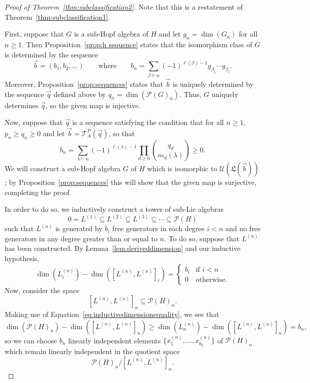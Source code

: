 \documentclass[11pt]{amsart}
\theoremstyle{definition}
\numberwithin{equation}{section}
\begin{document}
\begin{proof}[Proof of Theorem~\ref{thm:subclassification2}]
Note that this is a restatement of Theorem~\ref{thm:subclassification1}.  

First, suppose that $G$ is a sub-Hopf algebra of $H$ and let $g_{n} = \dim(G_{n})$ for all $n \ge 1$.  Then Proposition~\ref{prop:h sequence} states that the isomorphism class of $G$ is determined by the sequence
\[
\vec{b} = (b_{1}, b_{2}, \ldots) 
\qquad\text{where}\qquad
b_{n} = \sum_{\beta \vDash n} (-1)^{\ell(\beta) - 1} g_{\beta_{1}} \cdots g_{\beta_{\ell}}.
\]
Moreover, Proposition~\ref{prop:sequences} states that $\vec{b}$ is uniquely determined by the sequence $\vec{q}$ defined above by $q_{n} = \dim(\mathcal{P}(G)_{n})$.  Thus, $G$ uniquely determines $\vec{q}$, so the given map is injective.

Now, suppose that $\vec{q}$ is a sequence satisfying the condition that for all $n \ge 1$, $p_{n} \ge q_{n} \ge 0$ and let $\vec{b} = \mathcal{T}^{P}_{A}(\vec{q})$, so that
\[
b_{n} = \sum_{\lambda \vdash n} (-1)^{\ell(\lambda) - 1} \prod_{d \ge 0} \binom{q_{d}}{m_{d}(\lambda)} \ge 0.
\]
We will construct a sub-Hopf algebra $G$ of $H$ which is isomorphic to $\mathcal{U}(\mathfrak{L}(\vec{b}))$; by Proposition~\ref{prop:sequences} this will show that the given map is surjective, completing the proof.  

In order to do so, we inductively construct a tower of sub-Lie algebras 
\[
0 = L^{(1)} \subseteq L^{(2)} \subseteq L^{(3)} \subseteq \cdots \subseteq \mathcal{P}(H)
\]
such that $L^{(n)}$ is generated by $b_{i}$ free generators in each degree $i < n$ and no free generators in any degree greater than or equal to $n$.  
To do so, suppose that $L^{(n)}$ has been constructed.  By Lemma~\ref{lem:deriveddimension} and our inductive hypothesis,
\begin{equation}
\label{eq:inductivedimensionequality}
\dim(L^{(n)}_{i}) - \dim([L^{(n)}, L^{(n)}]_{i}) = \begin{cases} b_{i} & \text{if $i < n$} \\ 0 & \text{otherwise}. \end{cases}
\end{equation}
Now, consider the space
\[
[L^{(n)}, L^{(n)}]_{n} \subseteq \mathcal{P}(H)_{n}.
\]
Making use of Equation~\eqref{eq:inductivedimensionequality}, we see that 
\[
\dim(\mathcal{P}(H)_{n}) - \dim([L^{(n)}, L^{(n)}]_{n}) \ge \dim(L^{(n)}_{n}) - \dim([L^{(n)}, L^{(n)}]_{n}) = b_{n},
\]
so we can choose $b_{n}$ linearly independent elements $\{x^{(n)}_{1}, \ldots, x^{(n)}_{b_{n}}\}$ of $\mathcal{P}(H)_{n}$ which remain linearly independent in the quotient space 
\[
\mathcal{P}(H)_{n} \big/ [L^{(n)}, L^{(n)}]_{n}.
\]


\end{proof}
\end{document}
